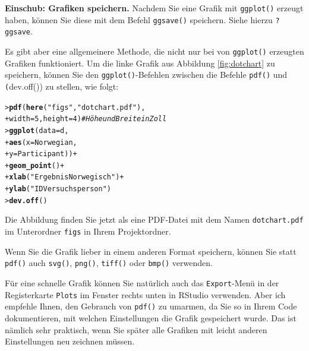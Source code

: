\documentclass[oneside, 10pt]{book}\usepackage[]{graphicx}\usepackage[]{xcolor}
\makeatletter
\newcommand{\hlnum}[1]{\textcolor[rgb]{0.686,0.059,0.569}{#1}}%
\newcommand{\hlstr}[1]{\textcolor[rgb]{0.192,0.494,0.8}{#1}}%
\newcommand{\hlcom}[1]{\textcolor[rgb]{0.678,0.584,0.686}{\textit{#1}}}%
\newcommand{\hlopt}[1]{\textcolor[rgb]{0,0,0}{#1}}%
\newcommand{\hlstd}[1]{\textcolor[rgb]{0.345,0.345,0.345}{#1}}%
\newcommand{\hlkwc}[1]{\textcolor[rgb]{0.333,0.667,0.333}{#1}}%
\newcommand{\hlkwd}[1]{\textcolor[rgb]{0.737,0.353,0.396}{\textbf{#1}}}%
\newenvironment{kframe}{%
 \def\at@end@of@kframe{}%
 \ifinner\ifhmode%
  \def\at@end@of@kframe{\end{minipage}}%
  \begin{minipage}{\columnwidth}%
 \fi\fi%
 \def\FrameCommand##1{\hskip\@totalleftmargin \hskip-\fboxsep
 \colorbox{shadecolor}{##1}\hskip-\fboxsep
     \hskip-\linewidth \hskip-\@totalleftmargin \hskip\columnwidth}%
 \MakeFramed {\advance\hsize-\width
   \@totalleftmargin\z@ \linewidth\hsize
   \@setminipage}}%
 {\par\unskip\endMakeFramed%
 \at@end@of@kframe}
\newenvironment{knitrout}{}{} %
\makeatother
\begin{document}
\begin{framed}
\textbf{Einschub: Grafiken speichern.}
Nachdem Sie eine Grafik mit \texttt{ggplot()}
erzeugt haben, können Sie diese mit dem Befehl
\texttt{ggsave()} speichern. Siehe hierzu \texttt{?ggsave}.

Es gibt aber eine allgemeinere Methode, die nicht nur bei von \texttt{ggplot()}
erzeugten Grafiken funktioniert. Um die linke Grafik aus Abbildung \ref{fig:dotchart}
zu speichern, können Sie den \texttt{ggplot()}-Befehlen zwischen die Befehle
\texttt{pdf()} und \texttt(dev.off()) zu stellen, wie folgt:
\begin{knitrout}
\color{fgcolor}\begin{kframe}
\begin{alltt}
\hlstd{> }\hlkwd{pdf}\hlstd{(}\hlkwd{here}\hlstd{(}\hlstr{"figs"}\hlstd{,} \hlstr{"dotchart.pdf"}\hlstd{),}
\hlstd{+ }    \hlkwc{width} \hlstd{=} \hlnum{5}\hlstd{,} \hlkwc{height} \hlstd{=} \hlnum{4}\hlstd{)} \hlcom{# Höhe und Breite in Zoll}
\hlstd{> }\hlkwd{ggplot}\hlstd{(}\hlkwc{data} \hlstd{= d,}
\hlstd{+ }       \hlkwd{aes}\hlstd{(}\hlkwc{x} \hlstd{= Norwegian,}
\hlstd{+ }           \hlkwc{y} \hlstd{= Participant))} \hlopt{+}
\hlstd{+ }  \hlkwd{geom_point}\hlstd{()} \hlopt{+}
\hlstd{+ }  \hlkwd{xlab}\hlstd{(}\hlstr{"Ergebnis Norwegisch"}\hlstd{)} \hlopt{+}
\hlstd{+ }  \hlkwd{ylab}\hlstd{(}\hlstr{"ID Versuchsperson"}\hlstd{)}
\hlstd{> }\hlkwd{dev.off}\hlstd{()}
\end{alltt}
\end{kframe}
\end{knitrout}
Die Abbildung finden Sie jetzt als eine PDF-Datei
mit dem Namen \texttt{dotchart.pdf} im Unterordner \texttt{figs} in Ihrem Projektordner.

Wenn Sie die Grafik lieber in einem anderen Format speichern, können
Sie statt \texttt{pdf()} auch \texttt{svg()}, \texttt{png()}, \texttt{tiff()} oder
\texttt{bmp()} verwenden.

Für eine schnelle Grafik können Sie natürlich auch das \texttt{Export}-Menü
in der Registerkarte \texttt{Plots} im Fenster rechts unten in RStudio verwenden.
Aber ich empfehle Ihnen, den Gebrauch von \texttt{pdf()} zu umarmen, da Sie so
in Ihrem Code dokumentieren, mit welchen Einstellungen die Grafik gespeichert wurde.
Das ist nämlich sehr praktisch, wenn Sie später alle Grafiken mit leicht anderen
Einstellungen neu zeichnen müssen.
\end{framed}

\medskip
\end{document}
